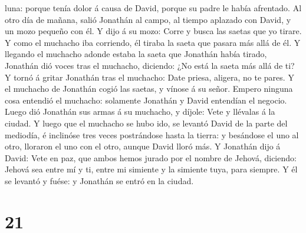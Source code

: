 luna: porque tenía dolor á causa de David, porque su padre le había
afrentado.  Al otro día de mañana, salió Jonathán al campo,
al tiempo aplazado con David, y un mozo pequeño con él.  Y
dijo á su mozo: Corre y busca las saetas que yo tirare. Y como el
muchacho iba corriendo, él tiraba la saeta que pasara más allá de él.
 Y llegando el muchacho adonde estaba la saeta que Jonathán
había tirado, Jonathán dió voces tras el muchacho, diciendo: ¿No está la
saeta más allá de ti?  Y tornó á gritar Jonathán tras el
muchacho: Date priesa, aligera, no te pares. Y el muchacho de Jonathán
cogió las saetas, y vínose á su señor.  Empero ninguna cosa
entendió el muchacho: solamente Jonathán y David entendían el negocio.
 Luego dió Jonathán sus armas á su muchacho, y díjole: Vete
y llévalas á la ciudad.  Y luego que el muchacho se hubo
ido, se levantó David de la parte del mediodía, é inclinóse tres veces
postrándose hasta la tierra: y besándose el uno al otro, lloraron el uno
con el otro, aunque David lloró más.  Y Jonathán dijo á
David: Vete en paz, que ambos hemos jurado por el nombre de Jehová,
diciendo: Jehová sea entre mí y ti, entre mi simiente y la simiente
tuya, para siempre. Y él se levantó y fuése: y Jonathán se entró en la
ciudad.

\hypertarget{section-20}{%
\section{21}\label{section-20}}

